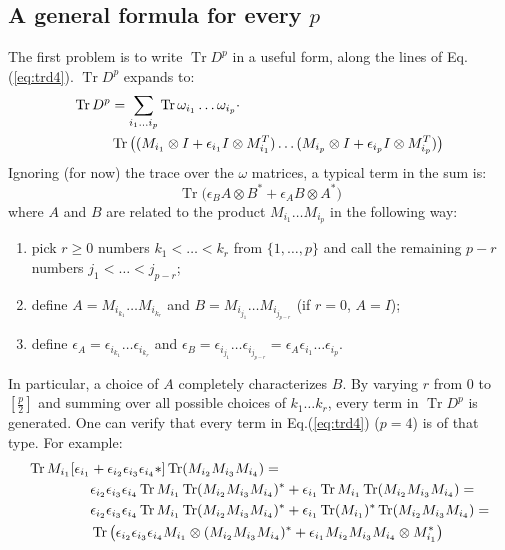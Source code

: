 \documentclass[12pt,a4paper]{article}
\DeclareMathOperator{\Tr}{Tr}
\begin{document}
\subsection{A general formula for every $p$}
The first problem is to write $\Tr D^p$ in a useful form, along the lines of Eq.(\ref{eq:trd4}).\newline
$\Tr D^p$ expands to:
\begin{align}
\Tr D^p &= \sum_{i_1 \ldots i_p} \Tr \omega_{i_1} \ldots \omega_{i_p} \cdot \notag \\
&\Tr \big( (M_{i_1} \otimes I + \epsilon_{i_1} I \otimes M_{i_1}^T) \ldots  (M_{i_p} \otimes I + \epsilon_{i_p} I \otimes M_{i_p}^T) \big)
\end{align}
Ignoring (for now) the trace over the $\omega$ matrices, a typical term in the sum is:
\begin{equation}\label{eq:typical}
\Tr \big( \epsilon_B A \otimes B^* + \epsilon_A B \otimes A^* \big)
\end{equation}
where $A$ and $B$ are related to the product $M_{i_1} \ldots M_{i_p}$ in the following way:
\begin{enumerate}
\item pick $r \geq 0$ numbers $k_1 < \ldots < k_r$ from $\{1, \ldots , p\}$ and call the remaining $p-r$ numbers $j_1 < \ldots < j_{p-r}$;
\item define $A = M_{i_{k_1}} \ldots M_{i_{k_r}}$ and $B = M_{i_{j_1}} \ldots M_{i_{j_{p-r}}}$ (if $r=0$, $A=I$);
\item define $\epsilon_A = \epsilon_{i_{k_1}} \ldots \epsilon_{i_{k_r}}$ and $\epsilon_B = \epsilon_{i_{j_1}} \ldots \epsilon_{i_{j_{p-r}}} = \epsilon_A \epsilon_{i_1} \ldots \epsilon_{i_p}$.
\end{enumerate}
In particular, a choice of $A$ completely characterizes $B$. \newline
By varying $r$ from $0$ to $\left[\frac{p}{2}\right]$ and summing over all possible choices of $k_1 \ldots k_r$, every term in $\Tr D^p$ is generated.\newline
One can verify that every term in Eq.(\ref{eq:trd4}) ($p=4$) is of that type. For example:
\begin{align}
\Tr M_{i_1} [\epsilon_{i_1} &+ \epsilon_{i_2} \epsilon_{i_3} \epsilon_{i_4} *] \Tr ( M_{i_2} M_{i_3} M_{i_4}) = \notag \\
&\epsilon_{i_2} \epsilon_{i_3} \epsilon_{i_4} \Tr M_{i_1} \Tr (M_{i_2} M_{i_3} M_{i_4})^* + \epsilon_{i_1} \Tr M_{i_1} \Tr ( M_{i_2} M_{i_3} M_{i_4}) = \notag \\
&\epsilon_{i_2} \epsilon_{i_3} \epsilon_{i_4} \Tr M_{i_1} \Tr (M_{i_2} M_{i_3} M_{i_4})^* + \epsilon_{i_1} \Tr (M_{i_1})^* \Tr ( M_{i_2} M_{i_3} M_{i_4}) = \notag \\
&\Tr \big( \epsilon_{i_2} \epsilon_{i_3} \epsilon_{i_4}  M_{i_1} \otimes (M_{i_2} M_{i_3} M_{i_4})^* + \epsilon_{i_1}  M_{i_2} M_{i_3} M_{i_4} \otimes M_{i_1}^*  \big)
\end{align}
\end{document}
